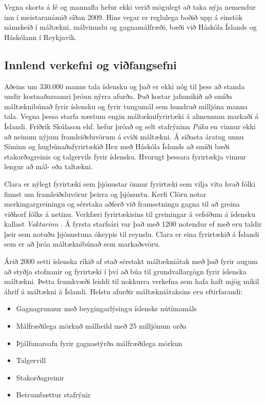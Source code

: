 \documentclass{../../metanetpaper}
\begin{document}
\begin{multicols}{2}
Vegna skorts á fé og mannafla hefur ekki verið mögulegt að taka nýja nemendur inn í meistaranámið síðan 2009. Hins vegar er reglulega boðið upp á einstök námskeið í máltækni, málvinnslu og gagnamálfræði, bæði við Háskóla Íslands og Háskólann í Reykjavík.

\subsection{Innlend verkefni og viðfangsefni}

Aðeins um 330.000 manns tala íslensku og það er ekki nóg til þess að standa undir kostnaðarsamri þróun nýrra afurða. Það kostar jafnmikið að smíða máltæknibúnað fyrir íslensku og fyrir tungumál sem hundruð milljóna manna tala. Vegna þessa starfa næstum engin máltæknifyrirtæki á almennum markaði á Íslandi. Friðrik Skúlason ehf. hefur þróað og selt stafrýninn \textit{Púka} en vinnur ekki að neinum nýjum framleiðsluvörum á sviði máltækni. Á síðasta áratug unnu Síminn og hugbúnaðafyrirtækið Hex með Háskóla Íslands að smíði bæði stakorðagreinis og talgervils fyrir íslensku. Hvorugt þessara fyrirtækja vinnur lengur að mál- eða taltækni.

Clara er nýlegt fyrirtæki sem þjónustar önnur fyrirtæki sem vilja vita hvað fólki finnst um framleiðsluvörur þeirra og þjónustu. Kerfi Clöru notar merkingargreiningu og sérstaka aðferð við framsetningu gagna til að greina viðhorf fólks á netinu. Verkfæri fyrirtækisins til greiningar á vefsíðum á íslensku kallast \textit{Vaktarinn} \cite{vak1}.  Á fyrsta starfsári var það með 1200 notendur ef með eru taldir þeir sem notuðu þjónustuna ókeypis til reynslu. Clara er eina fyrirtækið á Íslandi sem er að þróa máltæknibúnað sem markaðsvöru.

Árið 2000 setti íslenska ríkið af stað sérstakt máltækniátak með það fyrir augum að styðja stofnanir og fyrirtæki í því að búa til grundvallargögn fyrir íslenska máltækni. Þetta frumkvæði leiddi til nokkurra verkefna sem hafa haft mjög mikil áhrif á máltækni á Íslandi. Helstu afurðir máltækniátaksins eru eftirfarandi: \cite{ilrt1}  

\begin{itemize}
\item Gagnagrunnur með beygingarlýsingu íslensks nútímamáls
\item Málfræðilega mörkuð málheild með 25 milljónum orða 
\item Þjálfunarsafn fyrir gagnastýrða málfræðilega mörkun
\item Talgervill
\item Stakorðagreinir 
\item Betrumbættur stafrýnir
\end{itemize}


\end{multicols}
\end{document}
